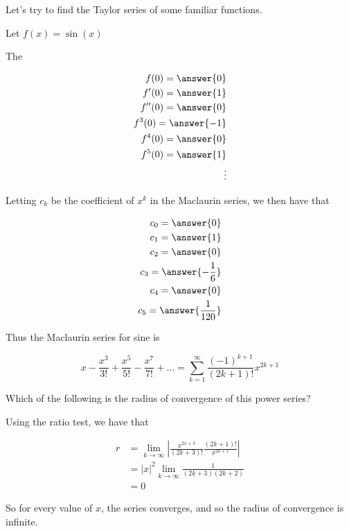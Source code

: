 \documentclass{ximera}
\begin{document}
\begin{example}
	Let's try to find the Taylor series of some familiar functions.
	
	Let $f(x) = \sin(x)$
	
	The
	
	\begin{align*}
		f(0) =  \answer{0}\\
		f'(0) = \answer{1}\\
		f''(0) = \answer{0}\\
		f^{3}(0) = \answer{-1}\\
		f^{4}(0) = \answer{0}\\
		f^{5}(0) = \answer{1}\\
		\vdots
	\end{align*}
	
	Letting $c_k$ be the coefficient of $x^k$ in the Maclaurin series, we then have that
	
	\begin{align*}
		c_0 = \answer{0}\\
		c_1 = \answer{1}\\
		c_2 = \answer{0}\\
		c_3 = \answer{-\frac{1}{6}}\\
		c_4 = \answer{0}\\
		c_5 = \answer{\frac{1}{120}}
	\end{align*}
	
	Thus the Maclaurin series for sine is 
	
	\[
	x-\frac{x^3}{3!}+\frac{x^5}{5!}-\frac{x^7}{7!}+... = \sum_{k=1}^\infty \frac{(-1)^{k+1}}{(2k+1)!} x^{2k+1}
	\]
	
	Which of the following is the radius of convergence of this power series?
	\begin{multipleChoice}
		\choice{$\pi$}
		\choice[correct]{$\infty$}
	\end{multipleChoice}
	
	\begin{hint}
		Using the ratio test, we have that 
		
		\begin{align*}
			r &= \lim_{k \to \infty} \left| \frac{x^{2x+3}}{(2k+3)!} \frac{(2k+1)!}{x^{2k+1}} \right|\\
			&= |x|^2 \lim_{k \to \infty} \frac{1}{(2k+3)(2k+2)}\\
			&=0
		\end{align*}
		
		So for every value of $x$, the series converges, and so the radius of convergence is infinite.
	\end{hint}
	
\end{example}
\end{document}
